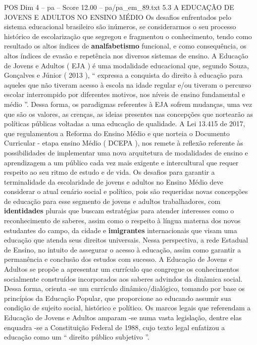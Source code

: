 \begin{textsample}{POS Dim 4 – pa – Score 12.00 – pa/pa\_em\_89.txt}  \label{ex:f4_pos_014}
5.3 A EDUCAÇÃO DE JOVENS E ADULTOS NO ENSINO MÉDIO Os desafios enfrentados pelo sistema educacional brasileiro são inúmeros, se considerarmos o seu processo histórico de escolarização que segregou e fragmentou o conhecimento, tendo como resultado os altos índices de \textbf{analfabetismo} funcional, e como consequência, os altos índices de evasão e repetência nos diversos sistemas de ensino.
A Educação de Jovens e Adultos ( EJA ) é uma modalidade educacional que, segundo Souza, Gonçalves e Júnior ( 2013 ), “ expressa a conquista do direito à educação para aqueles que não tiveram acesso à escola na idade regular e/ou tiveram o percurso escolar interrompido por diferentes motivos, nos níveis de ensino fundamental e médio ”.
Dessa forma, os paradigmas referentes à EJA sofrem mudanças, uma vez que são os valores, as crenças, as ideias presentes nas concepções que nortearão as políticas públicas voltadas a uma educação de qualidade.
A Lei 13.415 de 2017, que regulamentou a Reforma do Ensino Médio e que norteia o Documento Curricular - etapa ensino Médio ( DCEPA ), nos remete à reflexão referente às possibilidades de implementar uma nova arquitetura de modalidades de ensino e aprendizagem a um público cada vez mais exigente e intercultural que requer respeito ao seu ritmo de estudo e de vida.
Os desafios para garantir a terminalidade da escolaridade de jovens e adultos no Ensino Médio deve considerar o atual cenário social e político, pois são requeridas novas concepções de educação para esse segmento de jovens e adultos trabalhadores, com \textbf{identidades} plurais que buscam estratégias para atender interesses como o reconhecimento de saberes, assim como o respeito à língua materna dos novos estudantes do campo, da cidade e \textbf{imigrantes} internacionais que visam uma educação que atenda seus direitos universais.
Nessa perspectiva, a rede Estadual de Ensino, no intuito de assegurar o acesso à educação, assim como garantir a permanência e conclusão dos estudos com sucesso.
A Educação de Jovens e Adultos se propõe a apresentar um currículo que congregue os conhecimentos socialmente construídos incorporados aos saberes advindos da dinâmica social.
Dessa forma, orienta -se um currículo dinâmico/dialógico, tomando por base os princípios da Educação Popular, que proporcione ao educando assumir sua condição de sujeito social, histórico e político.
Os marcos legais que referendam a Educação de Jovens e Adultos amparam -se numa vasta legislação, dentre elas enquadra -se a Constituição Federal de 1988, cujo texto legal enfatizou a educação como um “ direito público subjetivo ”.

\end{textsample}
